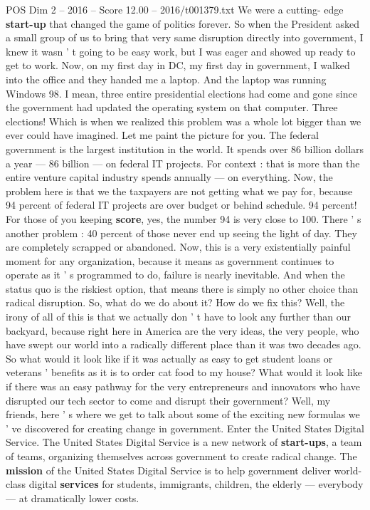 \begin{textsample}{POS Dim 2 – 2016 – Score 12.00 – 2016/t001379.txt}
We were a cutting- edge \textbf{start-up} that changed the game of politics forever.
So when the President asked a small group of us to bring that very same disruption directly into government, I knew it wasn ' t going to be easy work, but I was eager and showed up ready to get to work.
Now, on my first day in DC, my first day in government, I walked into the office and they handed me a laptop.
And the laptop was running Windows 98.
I mean, three entire presidential elections had come and gone since the government had updated the operating system on that computer.
Three elections!
Which is when we realized this problem was a whole lot bigger than we ever could have imagined.
Let me paint the picture for you.
The federal government is the largest institution in the world.
It spends over 86 billion dollars a year — 86 billion — on federal IT projects.
For context : that is more than the entire venture capital industry spends annually — on everything.
Now, the problem here is that we the taxpayers are not getting what we pay for, because 94 percent of federal IT projects are over budget or behind schedule. 94 percent!
For those of you keeping \textbf{score}, yes, the number 94 is very close to 100.
There ' s another problem : 40 percent of those never end up seeing the light of day.
They are completely scrapped or abandoned.
Now, this is a very existentially painful moment for any organization, because it means as government continues to operate as it ' s programmed to do, failure is nearly inevitable.
And when the status quo is the riskiest option, that means there is simply no other choice than radical disruption.
So, what do we do about it?
How do we fix this?
Well, the irony of all of this is that we actually don ' t have to look any further than our backyard, because right here in America are the very ideas, the very people, who have swept our world into a radically different place than it was two decades ago.
So what would it look like if it was actually as easy to get student loans or veterans ' benefits as it is to order cat food to my house?
What would it look like if there was an easy pathway for the very entrepreneurs and innovators who have disrupted our tech sector to come and disrupt their government?
Well, my friends, here ' s where we get to talk about some of the exciting new formulas we ' ve discovered for creating change in government.
Enter the United States Digital Service.
The United States Digital Service is a new network of \textbf{start-ups}, a team of teams, organizing themselves across government to create radical change.
The \textbf{mission} of the United States Digital Service is to help government deliver world-class digital \textbf{services} for students, immigrants, children, the elderly — everybody — at dramatically lower costs.

\end{textsample}
